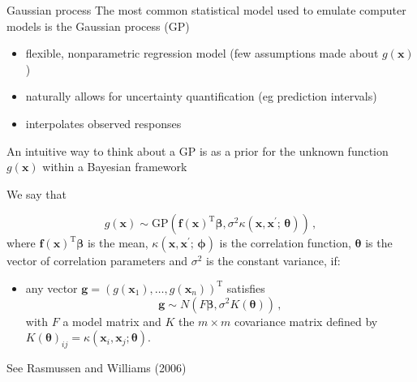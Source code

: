 \documentclass[
  ignorenonframetext,
]{beamer}
\providecommand{\tightlist}{%
  \setlength{\itemsep}{0pt}\setlength{\parskip}{0pt}}
\begin{document}
\begin{frame}{Gaussian process}
\protect\hypertarget{gaussian-process}{}
The most common statistical model used to emulate computer models is the
Gaussian process (GP)

\begin{itemize}
\tightlist
\item
  flexible, nonparametric regression model (few assumptions made about
  \(g(\boldsymbol{x})\))
\item
  naturally allows for uncertainty quantification (eg prediction
  intervals)
\item
  interpolates observed responses
\end{itemize}

An intuitive way to think about a GP is as a prior for the unknown
function \(g(\boldsymbol{x})\) within a Bayesian framework
\end{frame}

\begin{frame}{}
\protect\hypertarget{section-42}{}
We say that

\[
g(\boldsymbol{x})\sim \text{GP}\left(\boldsymbol{f}(\boldsymbol{x})^\mathrm{T}\boldsymbol{\beta}, \sigma^2\kappa(\boldsymbol{x},\boldsymbol{x}^\prime;\,\boldsymbol{\theta})\right)\,,
\] where \(\boldsymbol{f}(\boldsymbol{x})^\mathrm{T}\boldsymbol{\beta}\)
is the mean,
\(\kappa(\boldsymbol{x},\boldsymbol{x}^\prime;\,\boldsymbol{\phi})\) is
the correlation function, \(\boldsymbol{\theta}\) is the vector of
correlation parameters and \(\sigma^2\) is the constant variance, if:

\begin{itemize}
\tightlist
\item
  any vector
  \(\boldsymbol{g}= \left(g(\boldsymbol{x}_1), \dots , g(\boldsymbol{x}_n)\right)^{\mathrm{T}}\)
  satisfies
  \[\boldsymbol{g}\sim N\left(F\boldsymbol{\beta}, \sigma^2 K(\boldsymbol{\theta})\right)\,,\]
  with \(F\) a model matrix and \(K\) the \(m\times m\) covariance
  matrix defined by
  \(K(\boldsymbol{\theta})_{ij} = \kappa(\boldsymbol{x}_i,\boldsymbol{x}_j;\boldsymbol{\theta})\).
\end{itemize}

See Rasmussen and Williams (2006)
\end{frame}
\end{document}
